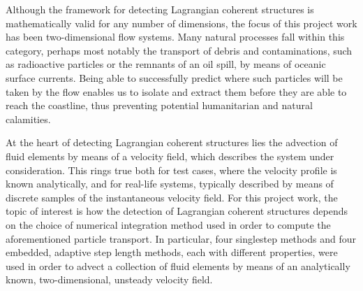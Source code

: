 Although the framework for detecting Lagrangian coherent structures is
mathematically valid for any number of dimensions, the focus of this project
work has been two-dimensional flow systems. Many natural processes fall
within this category, perhaps most notably the transport of debris and
contaminations, such as radioactive particles or the remnants of an oil
spill, by means of oceanic surface currents. Being able to successfully predict
where such particles will be taken by the flow enables us to isolate and
extract them before they are able to reach the coastline, thus preventing
potential humanitarian and natural calamities.

\newpage

At the heart of detecting Lagrangian coherent structures lies the advection
of fluid elements by means of a velocity field, which describes the system
under consideration. This rings true both for test cases, where the velocity
profile is known analytically, and for real-life systems, typically described
by means of discrete samples of the instantaneous velocity field. For this
project work, the topic of interest is how the detection of Lagrangian coherent
structures depends on the choice of numerical integration method used in order
to compute the aforementioned particle transport. In particular, four singlestep
methods and four embedded, adaptive step length methods, each with different
properties, were used in order to advect a collection of fluid elements
by means of an analytically known, two-dimensional, unsteady velocity field.




